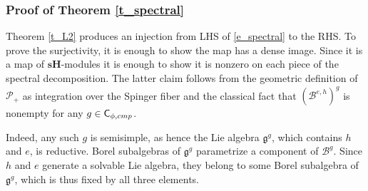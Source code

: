 \documentclass[14pt]{extarticle}
\newcommand{\cz}{\textup{\small \cursive z}}
\newcommand{\bC}{\mathsf{C}}
\newcommand{\cP}{\mathscr{P}}
\newcommand{\cB}{\mathscr{B}}
\newcommand{\sH}{\mathbf{sH}}
\newcommand{\fg}{\mathfrak{g}}
\newcommand{\comp}{\textup{cmp}}
\theoremstyle{definition}
\begin{document}

\subsubsection{Proof of Theorem \ref{t_spectral}}

Theorem \ref{t_L2} produces an injection from LHS of
\eqref{e_spectral} to the RHS. To prove the surjectivity, it is
enough to show the map has a dense image. Since it is a
map of $\sH$-modules it is enough to show it is nonzero on
each piece of the spectral decomposition. The latter claim
follows from the geometric definition of $\cP_+$ as integration
over the Spinger fiber and the classical fact that
$\left(\cB^{e,h}\right)^g$
is nonempty for any $g\in \bC_{\phi,\comp}$.

Indeed, any such $g$ is semisimple, as hence the Lie algebra
$\fg^g$, which contains $h$ and $e$, is reductive.
Borel subalgebras of $\fg^g$ parametrize
a component of  $\cB^g$. Since
$h$ and $e$ generate a solvable Lie algebra, they belong to
some Borel subalgebra of $\fg^g$, which is thus fixed by all three
elements. 

\end{document}
